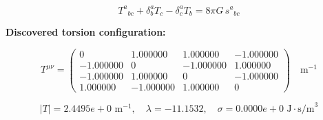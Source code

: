 
\begin{equation}
  T^a{}_{bc} + \delta^a_b T_c - \delta^a_c T_b = 8\pi G \, s^a{}_{bc}
\end{equation}

\textbf{Discovered torsion configuration:}

\begin{equation}
  T^{\mu\nu} = \begin{pmatrix}
    0 & 1.000000 & 1.000000 & -1.000000 \\
    -1.000000 & 0 & -1.000000 & 1.000000 \\
    -1.000000 & 1.000000 & 0 & -1.000000 \\
    1.000000 & -1.000000 & 1.000000 & 0
  \end{pmatrix} \quad \text{m}^{-1}
\end{equation}

\begin{equation}
  |T| = 2.4495e+0 \text{ m}^{-1}, \quad
  \lambda = -11.1532, \quad
  \sigma = 0.0000e+0 \text{ J}\cdot\text{s/m}^3
\end{equation}
